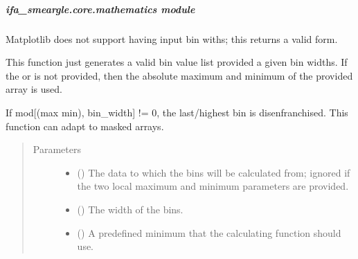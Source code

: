 \documentclass[letterpaper,10pt,english]{sphinxmanual}
\begin{document}
\subparagraph{ifa\_smeargle.core.mathematics module}
\label{\detokenize{docstrings/ifa_smeargle.core.mathematics:module-ifa_smeargle.core.mathematics}}\label{\detokenize{docstrings/ifa_smeargle.core.mathematics:ifa-smeargle-core-mathematics-module}}\label{\detokenize{docstrings/ifa_smeargle.core.mathematics::doc}}

\begin{fulllineitems}
\label{\detokenize{docstrings/ifa_smeargle.core.mathematics:ifa_smeargle.core.mathematics.generate_numpy_bin_width_array}}
Matplotlib does not support having input bin withs; this
returns a valid form.

This function just generates a valid bin value list provided a
given bin widths. If the  or
 is not provided, then the absolute
maximum and minimum of the provided array is used.

If mod{[}(max \sphinxhyphen{} min), bin\_width{]} != 0, the last/highest bin is
disenfranchised. This function can adapt to masked arrays.
\begin{quote}\begin{description}
\item[{Parameters}] \leavevmode\begin{itemize}
\item {} 
 () \textendash{} The data to which the bins will be calculated from;
ignored if the two local maximum and minimum parameters are
provided.

\item {} 
 () \textendash{} The width of the bins.

\item {} 
 (\sphinxstyleliteralemphasis{\sphinxupquote{ (}}\sphinxstyleliteralemphasis{\sphinxupquote{)}}) \textendash{} A predefined minimum that the calculating function
should use.


\end{itemize}
\end{description}
\end{quote}
\end{fulllineitems}
\end{document}
